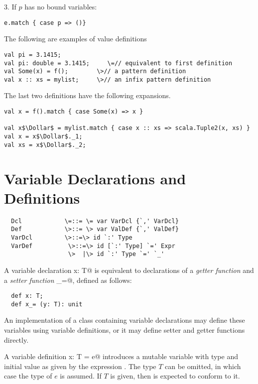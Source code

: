 \documentclass[11pt]{report}
\begin{document}
3. If $p$ has no bound variables:
\begin{verbatim}
e.match { case p => ()}
\end{verbatim}

\example
The following are examples of value definitions
\begin{verbatim}
val pi = 3.1415;
val pi: double = 3.1415;     \=// equivalent to first definition
val Some(x) = f();        \>// a pattern definition
val x :: xs = mylist;     \>// an infix pattern definition
\end{verbatim}

The last two definitions have the following expansions.
\begin{verbatim}
val x = f().match { case Some(x) => x }

val x$\Dollar$ = mylist.match { case x :: xs => scala.Tuple2(x, xs) }
val x = x$\Dollar$._1;
val xs = x$\Dollar$._2;

\end{verbatim}

\section{Variable Declarations and Definitions}
\label{sec:vardef}

\syntax\begin{verbatim}
  Dcl            \=::= \= var VarDcl {`,' VarDcl}
  Def            \>::= \> var ValDef {`,' ValDef}
  VarDcl         \>::=\> id `:' Type
  VarDef          \>::=\> id [`:' Type] `=' Expr
                  \>  |\> id `:' Type `=' `_'
\end{verbatim}

A variable declaration \verb@var x: T@ is equivalent to declarations
of a {\em getter function} \verb@x@ and a {\em setter function}
\verb@x_=@, defined as follows:

\begin{verbatim}
  def x: T;
  def x_= (y: T): unit
\end{verbatim}

An implementation of a class containing variable declarations
may define these variables using variable definitions, or it may
define setter and getter functions directly.

A variable definition \verb@var x: T = e@ introduces a mutable
variable with type \verb@T@ and initial value as given by the
expression \verb@e@. The type $T$ can be omitted, 
in which case the type of $e$ is assumed. If $T$ is given, then \verb@e@ 
is expected to conform to it.
\end{document}
